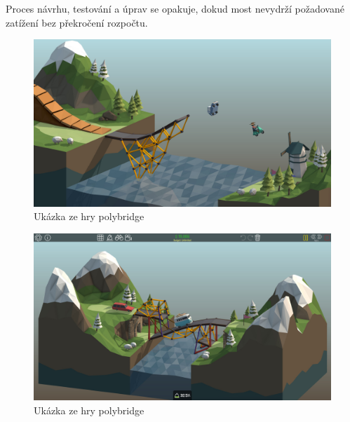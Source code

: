 Proces návrhu, testování a úprav se opakuje, dokud most nevydrží požadované zatížení bez překročení rozpočtu.

\begin{figure}[p]\centering
\includegraphics[width=\linewidth]{img/poly_screen_1.jpg}
\caption{Ukázka ze hry polybridge \citet{drycactus}}
\label{poly-fig:1}

\end{figure}

\begin{figure}[p]\centering
\includegraphics[width=\linewidth]{img/poly_screen_2.jpg}
\caption{Ukázka ze hry polybridge \citet{drycactus}}
\label{poly-fig:2}
\end{figure}



